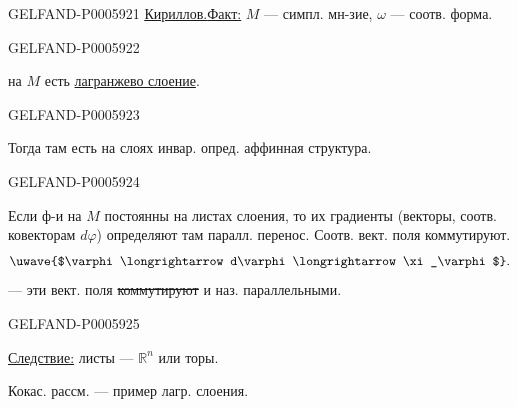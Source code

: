 \begin{GelfandAdjacentEvidence}{GELFAND-P000592}{1}
\underline{\underline{Кириллов.}}\quad \underline{Факт:}
\(M\) — симпл. мн-зие, \(\omega\) — соотв. форма.
\end{GelfandAdjacentEvidence}
\begin{GelfandAdjacentEvidence}{GELFAND-P000592}{2}


на \(M\) есть \underline{лагранжево слоение}.
\end{GelfandAdjacentEvidence}
\begin{GelfandAdjacentEvidence}{GELFAND-P000592}{3}

Тогда там есть на слоях инвар. опред. аффинная структура.
\end{GelfandAdjacentEvidence}
\begin{GelfandAdjacentEvidence}{GELFAND-P000592}{4}


Если ф-и на \(M\) постоянны на листах слоения, то их градиенты
(векторы, соотв. ковекторам \(d\varphi\)) определяют там паралл. перенос.
Соотв. вект. поля коммутируют.
\[
\text{\uwave{$\varphi\longrightarrow d\varphi\longrightarrow\xi_\varphi$}}.
\]
— эти вект. поля \sout{коммутируют} и наз. параллельными.
\end{GelfandAdjacentEvidence}
\begin{GelfandAdjacentEvidence}{GELFAND-P000592}{5}


\underline{Следствие:} листы — \(\mathbb R^n\) или торы.

Кокас. рассм. — пример лагр. слоения.
\end{GelfandAdjacentEvidence}
